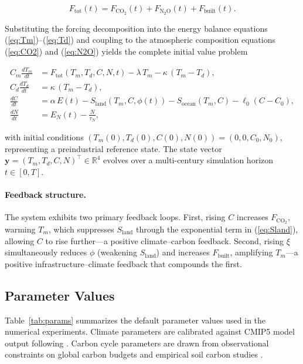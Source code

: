\documentclass[12pt]{article}
\newcommand{\ddt}[1]{\frac{d#1}{dt}}
\newcommand{\Ftot}{F_{\mathrm{tot}}}
\newcommand{\FCO}{F_{\mathrm{CO_2}}}
\newcommand{\FNO}{F_{\mathrm{N_2O}}}
\newcommand{\Fbuilt}{F_{\mathrm{built}}}
\newcommand{\Slam}{S_{\mathrm{land}}}
\newcommand{\Soce}{S_{\mathrm{ocean}}}
\begin{document}
\begin{equation}
  \Ftot(t) = \FCO(t) + \FNO(t) + \Fbuilt(t).
  \label{eq:Ftotal}
\end{equation}

Substituting the forcing decomposition into the energy balance equations
(\ref{eq:Tm})--(\ref{eq:Td}) and coupling to the atmospheric composition
equations (\ref{eq:CO2}) and (\ref{eq:N2O}) yields the complete initial value
problem

\begin{align}
  C_m \ddt{T_m} &= \Ftot(T_m, T_d, C, N, t) - \lambda\,T_m
                    - \kappa\,(T_m - T_d),
  \label{eq:sys1}\\
  C_d \ddt{T_d} &= \kappa\,(T_m - T_d),
  \label{eq:sys2}\\
  \ddt{C}        &= \alpha\,E(t) - \Slam(T_m,C,\phi(t))
                    - \Soce(T_m,C) - \ell_0(C-C_0),
  \label{eq:sys3}\\
  \ddt{N}        &= E_N(t) - \frac{N}{\tau_N},
  \label{eq:sys4}
\end{align}

with initial conditions
$(T_m(0), T_d(0), C(0), N(0)) = (0, 0, C_0, N_0)$,
representing a preindustrial reference state.  The state vector
$\mathbf{y} = (T_m, T_d, C, N)^\top \in \mathbb{R}^4$ evolves over a
multi-century simulation horizon $t \in [0, T]$.

\paragraph{Feedback structure.}
The system exhibits two primary feedback loops.  First, rising $C$ increases
$\FCO$, warming $T_m$, which suppresses $\Slam$ through the exponential term in
(\ref{eq:Sland}), allowing $C$ to rise further---a positive climate--carbon
feedback.  Second, rising $\xi$ simultaneously reduces $\phi$ (weakening
$\Slam$) and increases $\Fbuilt$, amplifying $T_m$---a positive
infrastructure--climate feedback that compounds the first.

\subsection{Parameter Values}
\label{sec:params}

Table~\ref{tab:params} summarizes the default parameter values used in the
numerical experiments.  Climate parameters are calibrated against CMIP5 model
output following \citet{Geoffroy2013}.  Carbon cycle parameters are drawn from
observational constraints on global carbon budgets \citep{Canadell2007,Ciais2013}
and empirical soil carbon studies \citep{Parton1987,LloydTaylor1994}.
\end{document}
